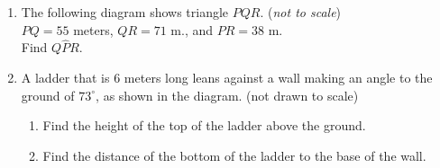 \documentclass[12pt, twoside]{article}
\begin{document}
\begin{enumerate}
\item The following diagram shows triangle $PQR$. (\emph{not to scale}) \\[0.25cm]
$PQ=55$ meters, $QR=71$ m., and $PR=38$ m. \\[0.25cm]
Find $Q\hat{P}R$.
  \begin{flushright}
  \end{flushright}

\newpage
\item A ladder that is 6 meters long leans against a wall making an angle to the ground of $73^\circ$, as shown in the diagram.  \hfill (not drawn to scale)
  \begin{multicols}{2}
    \begin{enumerate}
      \item Find the height of the top of the ladder above the ground. \vspace{2cm}
      \item Find the distance of the bottom of the ladder to the base of the wall.
    \end{enumerate} 
    \begin{flushright}
    \end{flushright}
  \end{multicols}
  \vspace{3cm}


\end{enumerate}
\end{document}
